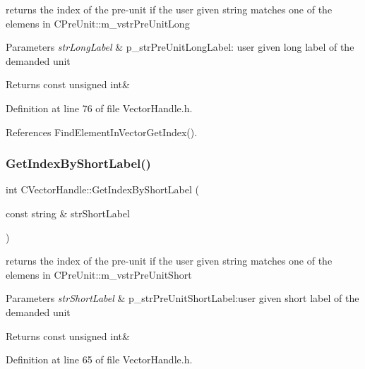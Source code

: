 returns the index of the pre-\/unit if the user given string matches one of the elemens in C\+Pre\+Unit\+::m\+\_\+vstr\+Pre\+Unit\+Long 


\begin{DoxyParams}{Parameters}
{\em str\+Long\+Label} & p\+\_\+str\+Pre\+Unit\+Long\+Label\+: user given long label of the demanded unit \\
\hline
\end{DoxyParams}
\begin{DoxyReturn}{Returns}
const unsigned int\& 
\end{DoxyReturn}


Definition at line 76 of file Vector\+Handle.\+h.



References Find\+Element\+In\+Vector\+Get\+Index().

\mbox{\label{classCVectorHandle_ab1c2a8cb7d2f87077c6be60a86e2ae16}} 
\subsubsection{\texorpdfstring{Get\+Index\+By\+Short\+Label()}{GetIndexByShortLabel()}}
{\footnotesize\ttfamily int C\+Vector\+Handle\+::\+Get\+Index\+By\+Short\+Label (\begin{DoxyParamCaption}\item[{const string \&}]{str\+Short\+Label }\end{DoxyParamCaption})\hspace{0.3cm}{\ttfamily [inline]}}



returns the index of the pre-\/unit if the user given string matches one of the elemens in C\+Pre\+Unit\+::m\+\_\+vstr\+Pre\+Unit\+Short 


\begin{DoxyParams}{Parameters}
{\em str\+Short\+Label} & p\+\_\+str\+Pre\+Unit\+Short\+Label\+:user given short label of the demanded unit \\
\hline
\end{DoxyParams}
\begin{DoxyReturn}{Returns}
const unsigned int\& 
\end{DoxyReturn}


Definition at line 65 of file Vector\+Handle.\+h.



